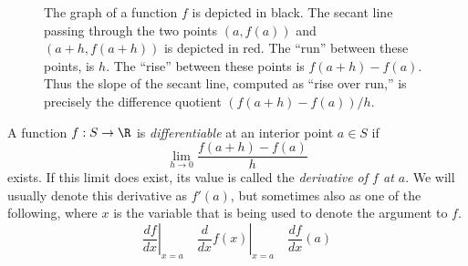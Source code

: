 \begin{figure}
	\begin{center}
\end{center}
\caption{The graph of a function $f$ is depicted in black. The secant line passing through the two points $(a, f(a))$ and $(a+h, f(a+h))$ is depicted in red. The ``run'' between these points, is $h$. The ``rise'' between these points is $f(a+h)-f(a)$. Thus the slope of the secant line, computed as ``rise over run,'' is precisely the difference quotient $(f(a+h)-f(a))/h$.}  \label{figure-difference-quotient}
\end{figure}

\begin{definition} \label{single-var-derivative-definition}
	A function $f : S \to \R$ is \emph{differentiable} at an interior point $a \in S$ if 
	\[ \lim_{h \to 0} \frac{f(a+h) - f(a)}{h} \]
	exists. If this limit does exist, its value is called the \emph{derivative of $f$ at $a$}. We will usually denote this derivative as $f'(a)$, but sometimes also as one of the following, where $x$ is the variable that is being used to denote the argument to $f$.  
	\[ \left.\frac{df}{dx}\right|_{x = a} \quad \left.\frac{d}{dx} f(x)\right|_{x = a} \quad \frac{df}{dx} (a) \] 
\end{definition}

